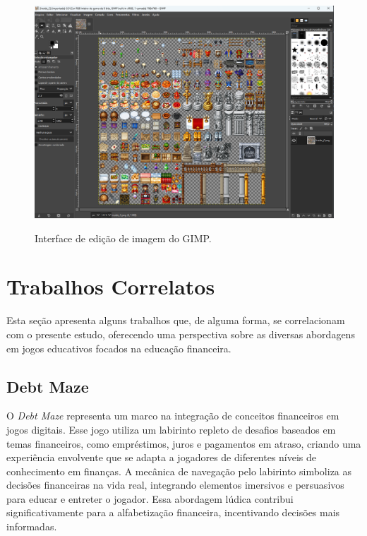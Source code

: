 \begin{figure}[ht]
	\centering
	\caption{Interface de edição de imagem do GIMP.}
	\includegraphics[scale=0.4]{Textuais/Pictures/Gimp.png}
	\label{fig:gimp-interface}
\end{figure}



\section{Trabalhos Correlatos}
Esta seção apresenta alguns trabalhos que, de alguma forma, se correlacionam com o presente estudo, oferecendo uma perspectiva sobre as diversas abordagens em jogos educativos focados na educação financeira.

\subsection{Debt Maze}
O \textit{Debt Maze} \cite{Debt_Maze} representa um marco na integração de conceitos financeiros em jogos digitais. Esse jogo utiliza um labirinto repleto de desafios baseados em temas financeiros, como empréstimos, juros e pagamentos em atraso, criando uma experiência envolvente que se adapta a jogadores de diferentes níveis de conhecimento em finanças. A mecânica de navegação pelo labirinto simboliza as decisões financeiras na vida real, integrando elementos imersivos e persuasivos para educar e entreter o jogador. Essa abordagem lúdica contribui significativamente para a alfabetização financeira, incentivando decisões mais informadas.

